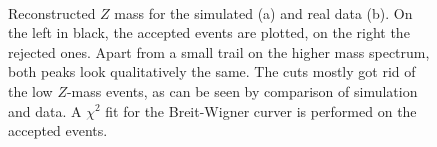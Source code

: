 \documentclass[twoside,        %
               BCOR12mm,       %
               ngerman,english, %
               fleqn,headsepline=false,footsepline=false
              ]{Vorlage/MFPREPORT}
\begin{document}
\begin{figure}
     \begin{center}
         \\ %
    \end{center}
    \caption{Reconstructed $Z$ mass for the simulated (a) and real data (b). On
    the left in black, the accepted events are plotted, on the right the
    rejected ones. Apart from a small trail on the higher mass spectrum, both
    peaks look qualitatively the same. The cuts mostly got rid of the low $Z$-mass
    events, as can be seen by comparison of simulation and data. A
    $\chi^2$ fit for the Breit-Wigner curver is performed on the accepted
    events.}
\end{figure}
\end{document}
